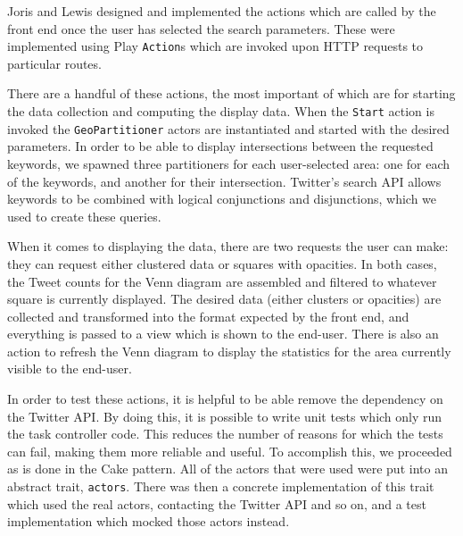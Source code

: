 Joris and Lewis designed and implemented the actions which are called by the
front end once the user has selected the search parameters.  These were
implemented using Play \verb+Action+s which are invoked upon HTTP requests to
particular routes.

There are a handful of these actions, the most important of which are for
starting the data collection and computing the display data.  When the
\verb+Start+ action is invoked the \verb+GeoPartitioner+ actors are
instantiated and started with the desired parameters.  In order to be able to
display intersections between the requested keywords, we spawned three
partitioners for each user-selected area: one for each of the keywords, and
another for their intersection.  Twitter's search API allows keywords to be
combined with logical conjunctions and disjunctions, which we used to create
these queries.

When it comes to displaying the data, there are two requests the user can make:
they can request either clustered data or squares with opacities.  In both
cases, the Tweet counts for the Venn diagram are assembled and filtered to
whatever square is currently displayed.  The desired data (either clusters or
opacities) are collected and transformed into the format expected
by the front end, and everything is passed to a view which is shown to the
end-user.  There is also an action to refresh the Venn diagram to display the
statistics for the area currently visible to the end-user.

In order to test these actions, it is helpful to be able remove the dependency
on the Twitter API.  By doing this, it is possible to write unit tests which
only run the task controller code.  This reduces the number of reasons for which
the tests can fail, making them more reliable and useful.  To accomplish this,
we proceeded as is done in the Cake pattern.  All of the actors that were used
were put into an abstract trait, \verb+actors+.  There was then a concrete
implementation of this trait which used the real actors, contacting the Twitter
API and so on, and a test implementation which mocked those actors instead.

